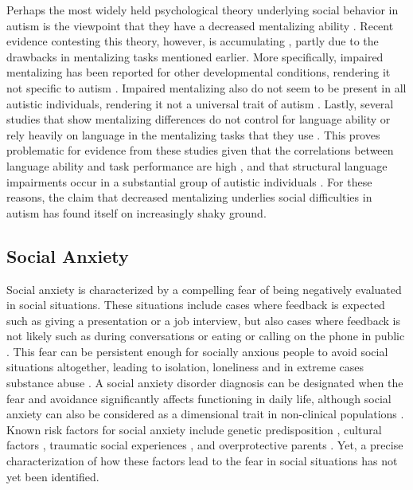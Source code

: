 Perhaps the most widely held psychological theory underlying social behavior in autism is the viewpoint that they have a decreased mentalizing ability \citep{baron-cohen1985}. Recent evidence contesting this theory, however, is accumulating \citep{gernsbacher2019}, partly due to the drawbacks in mentalizing tasks mentioned earlier. More specifically, impaired mentalizing has been reported for other developmental conditions, rendering it not specific to autism \citep{jenkins1996,loukusa2014}. Impaired mentalizing also do not seem to be present in all autistic individuals, rendering it not a universal trait of autism \citep{happe1993,moessnang2020}. Lastly, several studies that show mentalizing differences do not control for language ability or rely heavily on language in the mentalizing tasks that they use \citep{gernsbacher2005}. This proves problematic for evidence from these studies given that the correlations between language ability and task performance are high \citep{capage2001,shaked2006}, and that structural language impairments occur in a substantial group of autistic individuals \citep{velikonja2019}. For these reasons, the claim that decreased mentalizing underlies social difficulties in autism has found itself on increasingly shaky ground.

\subsection*{Social Anxiety}

Social anxiety is characterized by a compelling fear of being negatively evaluated in social situations. These situations include cases where feedback is expected such as giving a presentation or a job interview, but also cases where feedback is not likely such as during conversations or eating or calling on the phone in public \citep{apa2013}. This fear can be persistent enough for socially anxious people to avoid social situations altogether, leading to isolation, loneliness and in extreme cases substance abuse \citep{lemyre2019,lim2016}. A social anxiety disorder diagnosis can be designated when the fear and avoidance significantly affects functioning in daily life, although social anxiety can also be considered as a dimensional trait in non-clinical populations \citep{ruscio2010}. Known risk factors for social anxiety include genetic predisposition \citep{kendler1999}, cultural factors \citep{leung1994}, traumatic social experiences \citep{rapee2004}, and overprotective parents \citep{dulger2024,taylor2006}. Yet, a precise characterization of how these factors lead to the fear in social situations has not yet been identified. 

